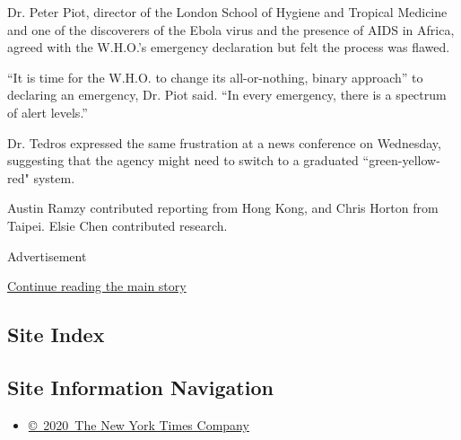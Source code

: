 Dr. Peter Piot, director of the London School of Hygiene and Tropical
Medicine and one of the discoverers of the Ebola virus and the presence
of AIDS in Africa, agreed with the W.H.O.'s emergency declaration but
felt the process was flawed.

``It is time for the W.H.O. to change its all-or-nothing, binary
approach'' to declaring an emergency, Dr. Piot said. ``In every
emergency, there is a spectrum of alert levels.''

Dr. Tedros expressed the same frustration at a news conference on
Wednesday, suggesting that the agency might need to switch to a
graduated ``green-yellow-red" system.

Austin Ramzy contributed reporting from Hong Kong, and Chris Horton from
Taipei. Elsie Chen contributed research.

Advertisement

\protect\hyperlink{after-bottom}{Continue reading the main story}

\hypertarget{site-index}{%
\subsection{Site Index}\label{site-index}}

\hypertarget{site-information-navigation}{%
\subsection{Site Information
Navigation}\label{site-information-navigation}}

\begin{itemize}
\tightlist
\item
  \href{https://help.nytimes.com/hc/en-us/articles/115014792127-Copyright-notice}{©~2020~The
  New York Times Company}
\end{itemize}

